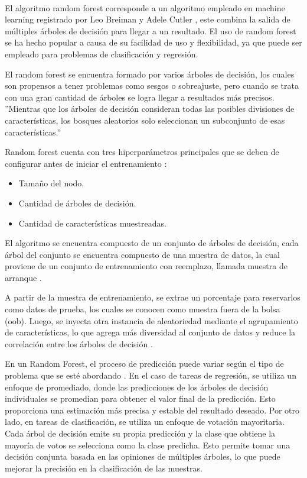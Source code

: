 \\
El algoritmo random forest corresponde a un algoritmo empleado en machine learning registrado por Leo Breiman y Adele Cutler \cite{random-forest}, este combina la salida de múltiples árboles de decisión para llegar a un resultado. El uso de random forest se ha hecho popular a causa de su facilidad de uso y flexibilidad, ya que puede ser empleado para problemas de clasificación y regresión.

El random forest se encuentra formado por varios árboles de decisión, los cuales son propensos a tener problemas como sesgos o sobreajuste, pero cuando se trata con una gran cantidad de árboles se logra llegar a resultados más precisos. ''Mientras que los árboles de decisión consideran todas las posibles divisiones de características, los bosques aleatorios solo seleccionan un subconjunto de esas características.'' \cite{random-forest}

Random forest cuenta con tres hiperparámetros principales que se deben de configurar antes de iniciar el entrenamiento \cite{random-forest}:

\begin{itemize}
    \item Tamaño del nodo.
    \item Cantidad de árboles de decisión.
    \item Cantidad de características muestreadas. 
\end{itemize}

El algoritmo se encuentra compuesto de un conjunto de árboles de decisión, cada árbol del conjunto se encuentra compuesto de una muestra de datos, la cual proviene de un conjunto de entrenamiento con reemplazo, llamada muestra de arranque \cite{random-forest}.

A partir de la muestra de entrenamiento, se extrae un porcentaje para reservarlos como datos de prueba, los cuales se conocen como muestra fuera de la bolsa (oob). Luego, se inyecta otra instancia de aleatoriedad mediante el agrupamiento de características, lo que agrega más diversidad al conjunto de datos y reduce la correlación entre los árboles de decisión \cite{random-forest}.

En un Random Forest, el proceso de predicción puede variar según el tipo de problema que se esté abordando \cite{random-forest}. En el caso de tareas de regresión, se utiliza un enfoque de promediado, donde las predicciones de los árboles de decisión individuales se promedian para obtener el valor final de la predicción. Esto proporciona una estimación más precisa y estable del resultado deseado. Por otro lado, en tareas de clasificación, se utiliza un enfoque de votación mayoritaria. Cada árbol de decisión emite su propia predicción y la clase que obtiene la mayoría de votos se selecciona como la clase predicha. Esto permite tomar una decisión conjunta basada en las opiniones de múltiples árboles, lo que puede mejorar la precisión en la clasificación de las muestras.

